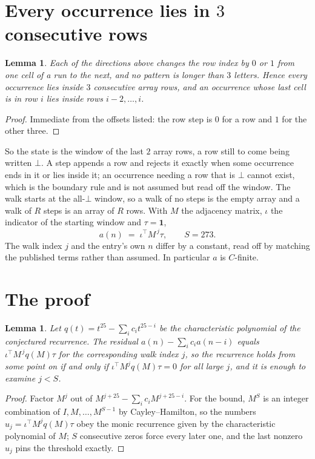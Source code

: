 \documentclass[11pt,a4paper]{article}
\theoremstyle{plain}
\newtheorem{lemma}[theorem]{Lemma}
\theoremstyle{definition}
\begin{document}
\section{Every occurrence lies in $3$ consecutive rows}

\begin{lemma}\label{lem:win}
Each of the directions above changes the row index by $0$ or $1$ from one cell of a run to the
next, and no pattern is longer than $3$ letters. Hence every occurrence lies inside $3$
consecutive array rows, and an occurrence whose last cell is in row $i$ lies inside rows
$i-2,\dots,i$.
\end{lemma}

\begin{proof}
Immediate from the offsets listed: the row step is $0$ for a row and $1$ for the other three.
\end{proof}

So the state is the window of the last $2$ array rows, a row still to come being written
$\bot$. A step appends a row and rejects it exactly when some occurrence ends in it or lies
inside it; an occurrence needing a row that is $\bot$ cannot exist, which is the boundary rule
and is not assumed but read off the window. The walk starts at the all-$\bot$ window, so a walk
of no steps is the empty array and a walk of $R$ steps is an array of $R$ rows. With $M$ the
adjacency matrix, $\iota$ the indicator of the starting window and $\tau=\mathbf{1}$,
\[
a(n)\;=\;\iota^{\!\top}M^{\,j}\tau ,\qquad S=273.
\]
The walk index $j$ and the entry's own $n$ differ by a constant, read off by matching the
published terms rather than assumed. In particular $a$ is $C$-finite.

\section{The proof}

\begin{lemma}\label{lem:crit}
Let $q(t)=t^{25}-\sum_i c_it^{25-i}$ be the characteristic polynomial of the
conjectured recurrence. The residual $a(n)-\sum_ic_ia(n-i)$ equals
$\iota^{\!\top}M^{\,j}q(M)\tau$ for the corresponding walk index $j$, so the recurrence
holds from some point on if and only if $\iota^{\!\top}M^{j}q(M)\tau=0$ for all large $j$,
and it is enough to examine $j<S$.
\end{lemma}

\begin{proof}
Factor $M^{j}$ out of $M^{j+25}-\sum_ic_iM^{j+25-i}$. For the bound, $M^{S}$
is an integer combination of $I,M,\dots,M^{S-1}$ by Cayley--Hamilton, so the numbers
$u_j=\iota^{\!\top}M^{j}q(M)\tau$ obey the monic recurrence given by the characteristic
polynomial of $M$; $S$ consecutive zeros force every later one, and the last nonzero $u_j$
pins the threshold exactly.
\end{proof}
\end{document}

